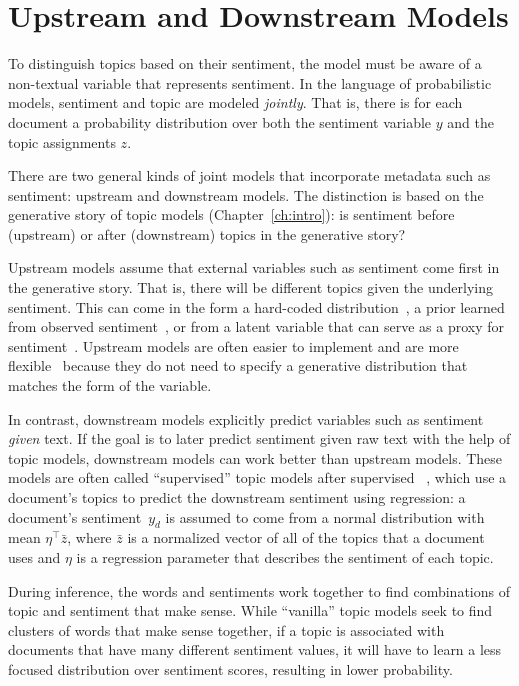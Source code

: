 
\section{Upstream and Downstream Models}

To distinguish topics based on their sentiment, the model must be
aware of a non-textual variable that represents sentiment.
In the language of probabilistic models,
sentiment and topic are modeled \emph{jointly}.  That is, there is for each document a
probability distribution over both the sentiment variable $y$ and
the topic assignments $z$.

There are two general kinds of joint models that incorporate metadata
such as sentiment: upstream and downstream models.  The distinction is
based on the generative story of topic models (Chapter~\ref{ch:intro}): is
sentiment before (upstream) or after (downstream) topics in the
generative story?


Upstream models assume that external variables such as sentiment come first in the generative
story.  That is, there will be different topics given the underlying
sentiment.  This can come in the form a hard-coded distribution~\citep{mei-07b}, a prior learned from observed
sentiment~\citep{mimno-08}, or from a latent variable that can serve as
a proxy for sentiment~\citep{lin-09}.  Upstream models are often
easier to implement and are more flexible~\citep{stewart-14} because they do not need to specify a generative distribution that matches the form of the variable.

In contrast, downstream models explicitly predict variables such as sentiment
\emph{given} text.  If the goal is to later predict sentiment given
raw text with the help of topic models, downstream models can work
better than upstream models.  These models are often called
``supervised'' topic models after supervised
~\citep{blei-07b}, which use a document's topics to predict
the downstream sentiment using regression: a document's sentiment~$y_d$ is
assumed to come from a normal distribution with mean $\eta^\top \bar
z$, where $\bar z$ is a normalized vector of all of the topics that a
document uses and $\eta$ is a regression parameter that describes the
sentiment of each topic.

During inference, the words and sentiments work together to find
combinations of topic and sentiment that make sense.  While
``vanilla'' topic models seek to find clusters of words that make
sense together, if a topic is associated with documents that have many
different sentiment values, it will have to learn a less focused distribution over
sentiment scores, resulting in lower probability.  

